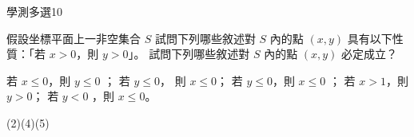     \begin{QUESTION}
        \begin{ExamInfo}{92}{學測}{多選}{10}
        \end{ExamInfo}
        \begin{ExamAnsRateInfo}{21}{43}{14}{6}
        \end{ExamAnsRateInfo}
        \begin{QBODY}
            假設坐標平面上一非空集合 $S$ 試問下列哪些敘述對 $S$ 內的點 $(x, y)$ 具有以下性質：「若  $x > 0$，則 $y > 0$」。 試問下列哪些敘述對 $S$ 內的點 $(x, y)$ 必定成立？ 
            \begin{QOPS} 
                \QOP 若 $x \leq 0$，則 $y \leq 0$ ；
                \QOP 若 $y \leq 0$， 則 $x \leq 0$；
                \QOP 若 $y \leq 0$，則 $x \leq 0$ ； 
                \QOP 若 $x >1$，則 $y>0$；  \QOP 若 $y<0$ ，則 $x \leq 0$。
            \end{QOPS}
        \end{QBODY}
        \begin{QFROMS}
        \end{QFROMS}
        \begin{QTAGS}\end{QTAGS}
        \begin{QANS}
            (2)(4)(5)
        \end{QANS}
        \begin{QSOLLIST}
        \end{QSOLLIST}
        \begin{QEMPTYSPACE}
        \end{QEMPTYSPACE}
    \end{QUESTION}
